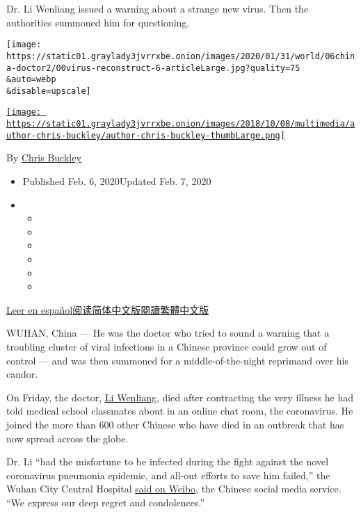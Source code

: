 Dr. Li Wenliang issued a warning about a strange new virus. Then the
authorities summoned him for questioning.

\texttt{[image: https://static01.graylady3jvrrxbe.onion/images/2020/01/31/world/06china-doctor2/00virus-reconstruct-6-articleLarge.jpg?quality=75\\\&auto=webp\\\&disable=upscale]}

\href{https://www.nytimes3xbfgragh.onion/by/chris-buckley}{\texttt{[image: https://static01.graylady3jvrrxbe.onion/images/2018/10/08/multimedia/author-chris-buckley/author-chris-buckley-thumbLarge.png]}}

By \href{https://www.nytimes3xbfgragh.onion/by/chris-buckley}{Chris
Buckley}

\begin{itemize}
\item
  Published Feb. 6, 2020Updated Feb. 7, 2020
\item
  \begin{itemize}
  \item
  \item
  \item
  \item
  \item
  \item
  \end{itemize}
\end{itemize}

\href{https://www.nytimes3xbfgragh.onion/es/2020/02/06/espanol/mundo/medico-coronavirus-enfermo.html}{Leer
en
español}\href{https://cn.nytimes3xbfgragh.onion/china/20200207/li-wenliang-coronavirus/}{阅读简体中文版}\href{https://cn.nytimes3xbfgragh.onion/china/20200207/li-wenliang-coronavirus/zh-hant/}{閱讀繁體中文版}

WUHAN, China --- He was the doctor who tried to sound a warning that a
troubling cluster of viral infections in a Chinese province could grow
out of control --- and was then summoned for a middle-of-the-night
reprimand over his candor.

On Friday, the doctor,
\href{https://www.nytimes3xbfgragh.onion/2020/02/07/world/asia/Li-Wenliang-china-coronavirus.html}{Li
Wenliang}, died after contracting the very illness he had told medical
school classmates about in an online chat room, the coronavirus. He
joined the more than 600 other Chinese who have died in an outbreak that
has now spread across the globe.

Dr. Li ``had the misfortune to be infected during the fight against the
novel coronavirus pneumonia epidemic, and all-out efforts to save him
failed,'' the Wuhan City Central Hospital
\href{https://www.weibo.com/whzxyy?is_hot=1}{said on Weibo}, the Chinese
social media service. ``We express our deep regret and condolences.''

